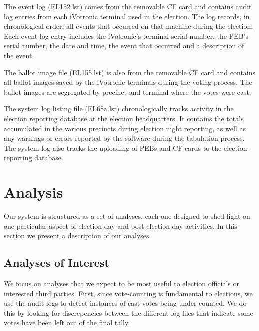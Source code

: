 \documentclass[letterpaper,twocolumn,10pt]{article}
\begin{document}
The event log (EL152.lst) comes from the removable CF card and contains audit
log entries from each iVotronic terminal used in the election. The log records,
in chronological order, all events that occurred on that machine during the
election. Each event log entry includes the iVotronic's terminal serial number,
the PEB's serial number, the date and time, the event that occurred and a
description of the event.

The ballot image file (EL155.lst) is also from the removable CF card and
contains all ballot images saved by the iVotronic terminals during the voting
process. The ballot images are segregated by precinct and terminal where the
votes were cast. 

The system log listing file (EL68a.lst) chronologically tracks activity in the
election reporting database at the election headquarters. It contains the totals
accumulated in the various precincts during election night reporting, as well as
any warnings or errors reported by the software during the tabulation
process. The system log also tracks the uploading of PEBs and CF cards to the
election-reporting database.

\section{Analysis}
Our system is structured as a set of analyses, each one designed to shed light
on one particular aspect of election-day and post election-day activities. In
this section we present a description of our analyses.

\subsection{Analyses of Interest}
We focus on analyses that we expect to be most useful to election officials or
interested third parties. First, since vote-counting is fundamental to
elections, we use the audit logs to detect instances of cast votes being
under-counted. We do this by looking for discrepencies between the
different log files that indicate some votes have been left out of the final
tally. 
\end{document}
